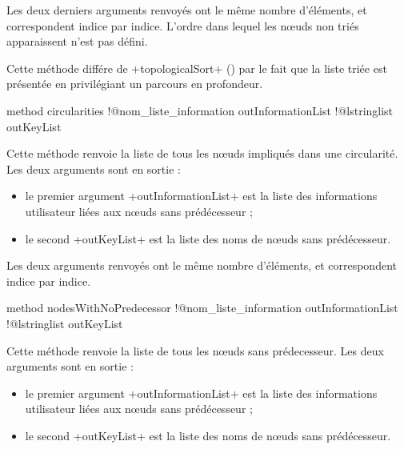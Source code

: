 Les deux derniers arguments renvoyés ont le même nombre d'éléments, et correspondent indice par indice. L'ordre dans lequel les nœuds non triés apparaissent n'est pas défini.

Cette méthode différe de \ggs+topologicalSort+ () par le fait que la liste triée est présentée en privilégiant un parcours en profondeur.







\begin{galgas}
method circularities
  !@nom_liste_information outInformationList
  !@lstringlist outKeyList
\end{galgas}

Cette méthode renvoie la liste de tous les nœuds impliqués dans une circularité. Les deux arguments sont en sortie :
\begin{itemize}
  \item le premier argument \ggs+outInformationList+ est la liste des informations utilisateur liées aux nœuds sans prédécesseur ;
  \item le second \ggs+outKeyList+ est la liste des noms de nœuds sans prédécesseur.
\end{itemize}

Les deux arguments renvoyés ont le même nombre d'éléments, et correspondent indice par indice.







\begin{galgas}
method nodesWithNoPredecessor
  !@nom_liste_information outInformationList
  !@lstringlist outKeyList
\end{galgas}

Cette méthode renvoie la liste de tous les nœuds sans prédecesseur. Les deux arguments sont en sortie :
\begin{itemize}
  \item le premier argument \ggs+outInformationList+ est la liste des informations utilisateur liées aux nœuds sans prédécesseur ;
  \item le second \ggs+outKeyList+ est la liste des noms de nœuds sans prédécesseur.
\end{itemize}

